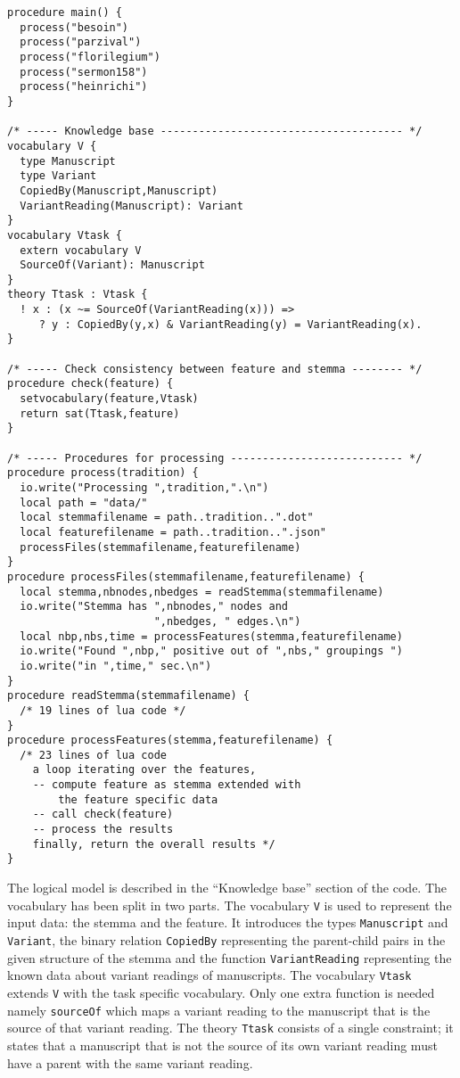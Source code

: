 \documentclass{tlp}
\renewcommand{\|}{\ensuremath{\,|\,}}
\renewcommand{\|}{\,|\,}
\begin{document}
\begin{lstlisting}[caption={Checking the consistency
    between stemma and features.},label={listing:idp-stemma}]
procedure main() {
  process("besoin")
  process("parzival")
  process("florilegium")
  process("sermon158")
  process("heinrichi")
}

/* ----- Knowledge base -------------------------------------- */
vocabulary V {
  type Manuscript
  type Variant
  CopiedBy(Manuscript,Manuscript)
  VariantReading(Manuscript): Variant
}
vocabulary Vtask {
  extern vocabulary V
  SourceOf(Variant): Manuscript
}
theory Ttask : Vtask {
  ! x : (x ~= SourceOf(VariantReading(x))) =>
     ? y : CopiedBy(y,x) & VariantReading(y) = VariantReading(x).
}

/* ----- Check consistency between feature and stemma -------- */
procedure check(feature) {
  setvocabulary(feature,Vtask)
  return sat(Ttask,feature)
}

/* ----- Procedures for processing --------------------------- */
procedure process(tradition) {
  io.write("Processing ",tradition,".\n")
  local path = "data/"
  local stemmafilename = path..tradition..".dot"
  local featurefilename = path..tradition..".json"
  processFiles(stemmafilename,featurefilename)
}
procedure processFiles(stemmafilename,featurefilename) {
  local stemma,nbnodes,nbedges = readStemma(stemmafilename)
  io.write("Stemma has ",nbnodes," nodes and
                       ",nbedges, " edges.\n")
  local nbp,nbs,time = processFeatures(stemma,featurefilename)
  io.write("Found ",nbp," positive out of ",nbs," groupings ")
  io.write("in ",time," sec.\n")
}
procedure readStemma(stemmafilename) {
  /* 19 lines of lua code */
}
procedure processFeatures(stemma,featurefilename) {
  /* 23 lines of lua code
    a loop iterating over the features, 
    -- compute feature as stemma extended with
        the feature specific data
    -- call check(feature)
    -- process the results
    finally, return the overall results */
}
\end{lstlisting}



The logical model is described in the ``Knowledge base'' section of the code.
The vocabulary has been split in two parts. The vocabulary
\texttt{V} is used to represent the input data: the stemma and the
feature. It introduces the types \texttt{Manuscript} and
\texttt{Variant}, the binary relation \texttt{CopiedBy} representing
the parent-child pairs in the given structure of the stemma and the
function \texttt{VariantReading} representing the known data about
variant readings of manuscripts.  The vocabulary \texttt{Vtask}
extends \texttt{V} with the task specific vocabulary. Only one extra
function is needed namely \texttt{sourceOf} which maps a variant
reading to the manuscript that is the source of that variant reading.
The theory \texttt{Ttask} consists of a single constraint; it states
that a manuscript that is not the source of its own variant reading
must have a parent with the same variant reading.
\end{document}
